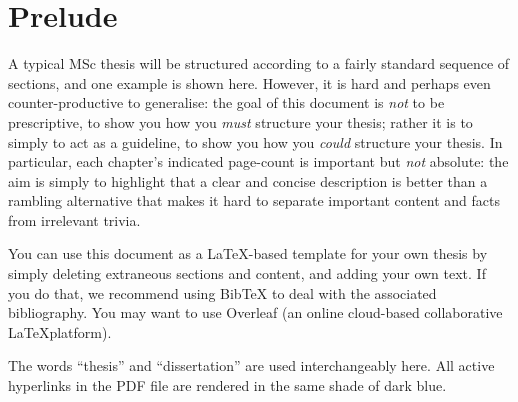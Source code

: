 \documentclass[ %
                    author={Daniel Page},
                supervisor={Dr. Andrew Calway},
                    degree={MSc},
                     title={Some Structural Guidelines for Data Science MSc Theses, Including Those With Long Titles that Run Across Multiple Lines on the Front Page},
                  subtitle={And those including an optional subtitle too, for good measure},
                      type={},
                      year={2021}]{dissertation}
\begin{document}


\section*{Prelude}
\thispagestyle{empty}


A typical MSc thesis will be structured according to a fairly standard sequence of 
sections, and one example is shown here.  However, it is hard and perhaps even 
counter-productive to generalise: the goal of this document is {\em not}\/ to be prescriptive, to show you how you {\em must} structure your thesis; rather it is to simply to act as a guideline, to show you how you {\em could} structure your thesis.  In particular, each chapter's indicated page-count is
important but {\em not}\/ absolute: the aim is simply to highlight that a 
clear and concise description is better than a rambling alternative that makes
it hard to separate important content and facts from irrelevant trivia.

You can use this document as a \LaTeX-based 
template for your own thesis by simply deleting extraneous sections
and content, and adding your own text. If you do that, we recommend using BibTeX
to deal with the associated bibliography. 
You may want to use Overleaf (an online cloud-based collaborative \LaTeX platform).


The words ``thesis'' and ``dissertation'' are used interchangeably here. All active hyperlinks in the PDF file are rendered in the same shade of dark blue. 






\maketitle

\end{document}
